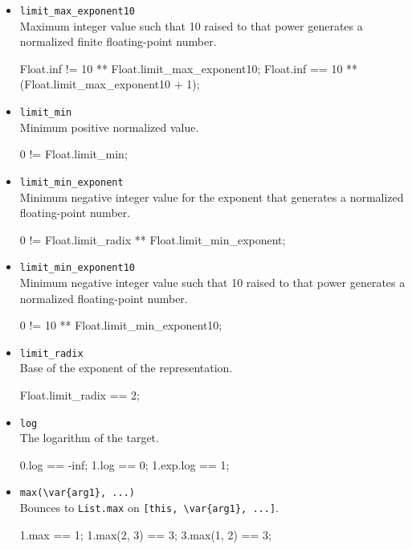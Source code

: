 \begin{itemize}
\item \lstinline|limit_max_exponent10|\\
  Maximum integer value such that 10 raised to that power generates a
  normalized finite floating-point number.
\begin{urbiassert}
Float.inf != 10 ** Float.limit_max_exponent10;
Float.inf == 10 ** (Float.limit_max_exponent10 + 1);
\end{urbiassert}

\item \lstinline|limit_min|\\
  Minimum positive normalized value.
\begin{urbiassert}
0 != Float.limit_min;
\end{urbiassert}

\item \lstinline|limit_min_exponent|\\
  Minimum negative integer value for the exponent that generates a
  normalized floating-point number.
\begin{urbiassert}
0 != Float.limit_radix ** Float.limit_min_exponent;
\end{urbiassert}

\item \lstinline|limit_min_exponent10|\\
  Minimum negative integer value such that 10 raised to that power
  generates a normalized floating-point number.
\begin{urbiassert}
0 != 10 ** Float.limit_min_exponent10;
\end{urbiassert}

\item \lstinline|limit_radix|\\
  Base of the exponent of the representation.
\begin{urbiassert}
Float.limit_radix == 2;
\end{urbiassert}

\item \lstinline|log|\\
  The logarithm of the target.
\begin{urbiassert}
0.log == -inf;
1.log == 0;
1.exp.log == 1;
\end{urbiassert}

\item \lstinline|max(\var{arg1}, ...)|\\
  Bounces to \lstinline|List.max| on \lstinline|[this, \var{arg1}, ...]|.
\begin{urbiassert}
1.max == 1;
1.max(2, 3) == 3;
3.max(1, 2) == 3;
\end{urbiassert}


\end{itemize}
